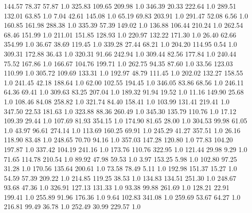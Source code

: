     144.57     78.37     57.87  1.0
    325.83    109.65    209.98  1.0
    346.39     20.33    222.64  1.0
    289.51    132.01     63.85  1.0
      7.04     42.61    145.08  1.0
     65.19     69.83    203.91  1.0
    291.47     52.08      6.56  1.0
    160.85    161.98    288.38  1.0
    335.39     57.39    149.02  1.0
    136.88    106.44    210.24  1.0
    262.54     68.46    151.99  1.0
    211.01    151.85    128.93  1.0
    220.97    132.22    171.30  1.0
     26.40     62.66    354.99  1.0
     36.67     38.69    119.45  1.0
    339.28     27.44     68.21  1.0
    204.20    114.95      0.54  1.0
    309.31    172.88     36.43  1.0
    320.31     91.66    242.94  1.0
    309.44     82.56    177.84  1.0
    240.44     75.52    167.86  1.0
    166.67    104.76    199.71  1.0
    262.75     94.35     87.60  1.0
     33.56    123.03    110.99  1.0
    305.72    109.69    133.31  1.0
    192.97     48.79    111.45  1.0
    202.02    132.27    158.55  1.0
    241.45     42.18    188.64  1.0
     62.00    102.55    194.45  1.0
    346.05     83.86     68.56  1.0
    246.11     64.36     69.41  1.0
    309.63     83.25    207.04  1.0
    189.32     91.94     19.52  1.0
     11.16    149.90     25.68  1.0
    108.46     84.08    258.82  1.0
    321.74     84.40    158.41  1.0
    103.99    131.41    219.41  1.0
    347.50     22.53    181.63  1.0
    323.88     88.36    260.49  1.0
    345.30    135.79    110.76  1.0
     17.12    109.39     29.44  1.0
    107.69     81.93    354.15  1.0
    174.90     81.65     28.00  1.0
    304.53     99.98     61.05  1.0
     43.97     96.61    274.14  1.0
    113.69    160.25     69.91  1.0
    245.29     41.27    357.51  1.0
     26.16    118.90     83.48  1.0
    248.65     70.70     94.16  1.0
    357.03    147.28    120.80  1.0
     77.83    104.20    197.87  1.0
    337.42    104.19    241.16  1.0
    173.76    110.76    322.95  1.0
    121.44     29.98      9.29  1.0
     71.65    114.78    210.54  1.0
     89.92     47.98     59.53  1.0
      3.97    153.25      5.98  1.0
    102.80     97.25     31.28  1.0
    170.56    135.64    200.61  1.0
     73.58     78.49      5.11  1.0
    192.98    151.37     15.27  1.0
     54.59     57.39    209.22  1.0
    214.85    119.25     38.53  1.0
    134.83    134.51    251.30  1.0
    248.67     93.68     47.36  1.0
    326.91    127.13    131.33  1.0
     93.38     99.88    261.69  1.0
    128.21     22.91    199.41  1.0
    255.89     91.96    176.36  1.0
      9.64    102.83    341.08  1.0
    259.69     53.67     64.27  1.0
    216.81     99.49     36.78  1.0
    252.49     30.99    229.57  1.0
